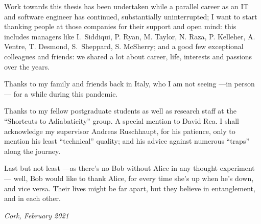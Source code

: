 {\small
  Work towards this thesis has been undertaken while a parallel career
  as an IT and software engineer has continued,
  substantially uninterrupted;
  I want to start thanking people at those companies for their support and open mind:
  this includes managers like
  I.~Siddiqui, P. Ryan, M. Taylor, N. Raza, P. Kelleher, A. Ventre, T. Desmond, S.~Sheppard, S. McSherry;
  and a good few exceptional colleagues and friends:
  we shared a lot about career, life, interests and passions over the years.

  Thanks to my family and friends back in Italy,
  who I am not seeing ---in person--- for a while during this pandemic.

  Thanks to my fellow postgraduate students
  as well as research staff
  at the ``Shortcuts to Adiabaticity'' group.
  A special mention to David Rea.
  I shall acknowledge my supervisor Andreas Ruschhaupt, for his patience,
  only to mention his least ``technical'' quality;
  and his advice against numerous ``traps'' along the journey.

  Last but not least ---as there's no Bob without Alice in any thought experiment---
  well, Bob would like to thank Alice,
  for every time she’s up when he’s down, and vice versa.
  Their lives might be far apart, but they believe in entanglement, and in each other.

  \emph{Cork, February 2021}
}